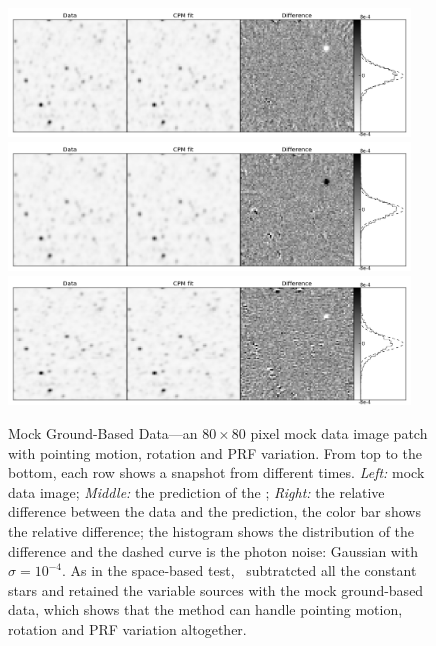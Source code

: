 \begin{figure}[p]
\begin{center}
\includegraphics[width=0.95\textwidth]{figures/cdi/f3a}
\includegraphics[width=0.95\textwidth]{figures/cdi/f3b}
\includegraphics[width=0.95\textwidth]{figures/cdi/f3c}
\end{center}
\caption{
  \label{ground}
  Mock Ground-Based Data---an $80\times 80$ pixel mock data image patch with pointing motion, rotation and PRF variation. 
  From top to the bottom,  each row shows a snapshot from different times.
  \emph{Left:} mock data image;
  \emph{Middle:} the prediction of the \cpmdiff;
  \emph{Right:} the relative difference between the data and the prediction, the color bar shows the relative difference; 
  the histogram shows the distribution of the difference and the dashed curve is the photon noise: Gaussian with $\sigma = 10^{-4}$. 
  As in the space-based test, \cpmdiff\ subtratcted all the constant stars and retained the variable sources with the mock ground-based data, which shows that the method can handle pointing motion, rotation and PRF variation altogether. 
}
\end{figure}

